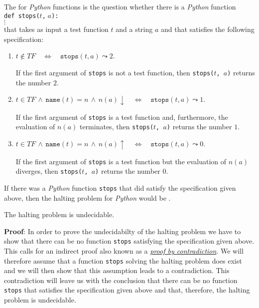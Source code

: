 \noindent
The   for \textsl{Python} functions is the question whether there is a
\textsl{Python} function \\[0.2cm]
\hspace*{1.3cm} \texttt{def stops($t$,$\;a$): } \\
\hspace*{2.3cm} $\vdots$
\\[0.2cm] 
that takes as input a test function $t$ and a string $a$ and that satisfies the following specification:
\begin{enumerate}
\item $t \not\in T\!F \quad\Leftrightarrow\quad \mathtt{stops}(t, a) \leadsto 2$.

      If the first argument of \texttt{stops} is not a test function, then 
      \texttt{stops($t$, $a$)} returns the number $2$.

\item $t \in T\!F \,\wedge\, \mathtt{name}(t) = n \,\wedge\, n(a)\downarrow \quad\Leftrightarrow\quad
       \mathtt{stops}(t, a) \leadsto 1$.

      If the first argument of \texttt{stops} is a test function and, furthermore,
      the evaluation of $n(a)$ terminates, then \texttt{stops($t$, $a$)} returns the number $1$.

\item $t \in T\!F \,\wedge\, \mathtt{name}(t) = n \,\wedge\, n(a)\uparrow \quad\Leftrightarrow\quad
       \mathtt{stops}(t, a) \leadsto 0$.

      If the first argument of \texttt{stops} is a test function but the evaluation of $n(a)$ 
      diverges, then \linebreak
      \texttt{stops($t$, $a$)} returns the number $0$.
\end{enumerate}
If there was a \textsl{Python} function \texttt{stops} that did satisfy the specification given above,
then the halting problem for \textsl{Python} would be .

\begin{Theorem}
  The halting problem is undecidable.
\end{Theorem}

\noindent
\textbf{Proof}:  In order to prove the undecidabilty of the halting problem we have to show that
there can be no function \texttt{stops} satisfying the specification given above.  This calls for an
indirect proof also known as a \href{http://en.wikipedia.org/wiki/Indirect_proof}{\emph{proof by contradiction}}.
We will therefore assume that a function \texttt{stops} solving the halting problem does
exist and we will then show that this assumption leads to a contradiction.  This contradiction will
leave us with the conclusion that there can be no function \texttt{stops} that satisfies
the specification given above and that, therefore, the halting problem is undecidable.

